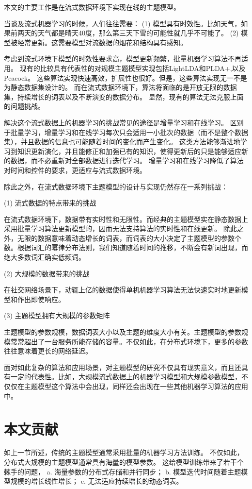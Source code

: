 本文的主要工作是在流式数据环境下实现在线的主题模型。

当谈及流式机器学习的时候，人们往往需要：
(1) 模型具有时效性。比如天气，如果前两天的天气都是晴天40度，那么第三天下雪的可能性就几乎不可能了。
(2) 模型被经常更新。这需要模型对流数据的烟花和结构具有感知。

考虑到流式环境下模型的时效性要求高，模型更新频繁，批量机器学习算法不再适用。
现有的比较具有代表性的对规模主题模型实现包括LightLDA\cite{yuan2015lightlda}和PLDA+\cite{Liu:2011:PPL:1961189.1961198},以及Peacock\cite{Peacock}。
这些算法实现快速高效，扩展性也很好。但是，这些算法实现无一不是为静态数据集设计的。
而在流式数据环境下，算法将面临的是开放无限的数据集，持续增长的词表以及不断演变的数据分布。
显然，现有的算法无法克服上面的问题挑战。

解决这个流式数据上的机器学习的挑战常见的途径是增量学习和在线学习。
区别于批量学习，增量学习和在线学习每次只会适用一小批次的数据（而不是整个数据集），并且数据的信息也可能随着时间的变化而产生变化。
这类方法能够渐进地学习到知识更新演化，并且能修正和加强已有的知识，使得更新后的只是能够适应新的数据，而不必重新对全部数据进行迭代学习。
增量学习和在线学习降低了算法对时间和控件的要求，更适应与流式数据环境。

除此之外，在流式数据环境下主题模型的设计与实现仍然存在一系列挑战：

(1) 流式数据的特点带来的挑战

在流式数据环境下，数据带有实时性和无限性。而经典的主题模型实在静态数据上采用批量学习算法更新模型的，因而无法支持算法的实时性和在线更新。
除此之外，无限的数据意味着动态增长的词表，而词表的大小决定了主题模型的参数个数。根据词汇的幂律分布法则，我们知道随着时间的推移，不断会有新词出现，而绝大多数词汇确实低频词。

(2) 大规模的数据带来的挑战

在社交网络场景下，动辄上亿的数据使得单机机器学习算法无法快速实时地更新模型和作出即使响应。

(3) 主题模型拥有大规模的参数矩阵

主题模型的参数规模，数据词表大小以及主题的维度大小有关。主题模型的参数规模常常超出了一台服务所能存储的容量。不仅如此，在分布式环境下，更多的参数往往意味着更长的网络延迟。

面对如此复杂的算法和应用场景，对主题模型的研究不仅具有现实意义，而且还具有一定的代表性。比如，大规模流式数据上的机器学习模型和大规模参数模型，不仅仅在主题模型这个算法中会出现，同样还会出现在一些其他机器学习算法的应用中。

\section{本文贡献}
如上一节所述，传统的主题模型通常采用批量的机器学习方法训练。
不仅如此，分布式大规模的主题模型通常具有海量的模型参数。
这给模型训练带来了若干个棘手的问题，
a. 海量参数的分布式存储和并行同步；
b. 模型迭代时间随着主题模型规模的增长线性增长；
c. 无法适应持续增长的动态词表。

